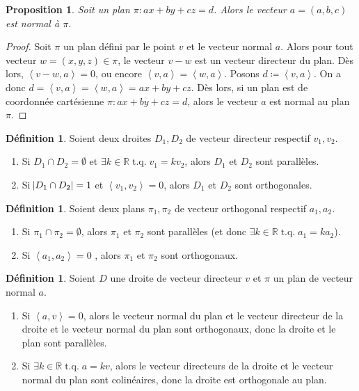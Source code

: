\documentclass{article}
\DeclareMathOperator{\tq}{\text{ t.q. }}
\newcommand{\R}{\mathbb R}
\newcommand{\scpr}[2]{\left\langle #1, #2\right\rangle}
\newtheorem{prp}[thm]{Proposition}
\theoremstyle{definition}
\newtheorem{déf}[thm]{Définition}
\theoremstyle{remark}
\begin{document}
		\begin{prp} Soit un plan $\pi : ax + by + cz = d$. Alors le vecteur $a = (a, b, c)$ est normal à $\pi$. \end{prp}

		\begin{proof} Soit $\pi$ un plan défini par le point $v$ et le vecteur normal $a$. Alors pour tout vecteur $w = (x, y, z) \in \pi$, le vecteur $v-w$ est un vecteur
		directeur du plan. Dès lors, $\scpr {v-w}a = 0$, ou encore $\scpr va = \scpr wa$. Posons $d \coloneqq \scpr va$. On a donc $d = \scpr va = \scpr wa = ax+by+cz$.
		Dès lors, si un plan est de coordonnée cartésienne $\pi : ax + by + cz = d$, alors le vecteur $a$ est normal au plan $\pi$. \end{proof}

		\begin{déf} Soient deux droites $D_1, D_2$ de vecteur directeur respectif $v_1, v_2$.
		\begin{enumerate}
			\item Si $D_1 \cap D_2 = \emptyset$ et $\exists k \in \R \tq v_1 = kv_2$, alors $D_1$ et $D_2$ sont parallèles.
			\item Si $\abs{D_1 \cap D_2} = 1$ et $\scpr {v_1}{v_2} = 0$, alors $D_1$ et $D_2$ sont orthogonales.
		\end{enumerate}
		\end{déf}

		\begin{déf} Soient deux plans $\pi_1, \pi_2$ de vecteur orthogonal respectif $a_1, a_2$.
		\begin{enumerate}
			\item Si $\pi_1 \cap \pi_2 = \emptyset$, alors $\pi_1$ et $\pi_2$ sont parallèles (et donc $\exists k \in \R \tq a_1 = ka_2$).
			\item Si $\scpr {a_1}{a_2} = 0$ , alors $\pi_1$ et $\pi_2$ sont orthogonaux.
		\end{enumerate}
		\end{déf}

		\begin{déf} Soient $D$ une droite de vecteur directeur $v$ et $\pi$ un plan de vecteur normal $a$.
		\begin{enumerate}
			\item Si $\scpr av = 0$, alors le vecteur normal du plan et le vecteur directeur de la droite et le vecteur normal du plan sont orthogonaux, donc la droite
			      et le plan sont parallèles.
			\item Si $\exists k \in \R \tq a = kv$, alors le vecteur directeurs de la droite et le vecteur normal du plan sont colinéaires, donc la droite est orthogonale
			      au plan.
		\end{enumerate}
		\end{déf}
\end{document}
